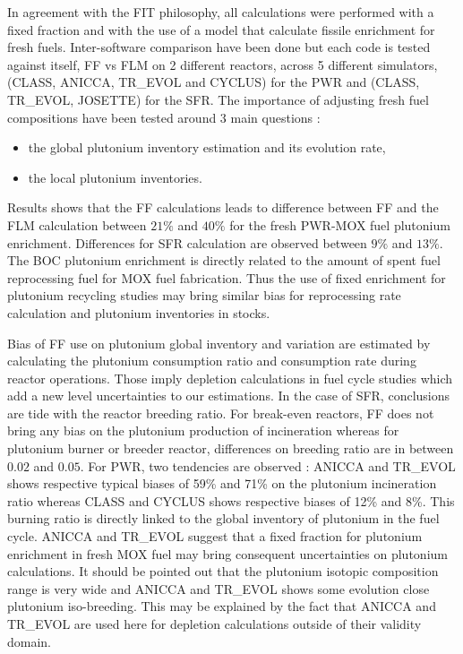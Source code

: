 In agreement with the FIT philosophy, all calculations were performed with a
fixed fraction and with the use of a model that calculate fissile enrichment for
fresh fuels. Inter-software comparison have been done but each code is tested
against itself, \gls{FF} vs \gls{FLM} on 2 different reactors, across 5 different
simulators, (CLASS, ANICCA, TR\_EVOL and CYCLUS) for the \gls{PWR} and (CLASS,
TR\_EVOL, JOSETTE) for the \gls{SFR}. The importance of adjusting fresh fuel
compositions have been tested around 3 main questions : 
\begin{itemize}
    \item the global plutonium inventory estimation and its evolution rate,
    \item the local plutonium inventories.
\end{itemize}

Results shows that the \gls{FF} calculations leads to difference between
\gls{FF} and the \gls{FLM} calculation between $21\%$ and $40\%$ for the fresh
\gls{PWR}-\gls{MOX} fuel plutonium enrichment. Differences for \gls{SFR}
calculation are observed between $9\%$ and $13\%$.  The \gls{BOC} plutonium
enrichment is directly related to the amount of spent fuel reprocessing fuel for
MOX fuel fabrication. Thus the use of fixed enrichment for plutonium recycling
studies may bring similar bias for reprocessing rate calculation and plutonium
inventories in stocks. 

Bias of \gls{FF} use on plutonium global inventory and variation are estimated
by calculating the plutonium consumption ratio and consumption rate during
reactor operations. Those imply depletion calculations in fuel cycle studies
which add a new level uncertainties to our estimations. In the case of
\gls{SFR}, conclusions are tide with the reactor breeding ratio. For break-even
reactors, \gls{FF} does not bring any bias on the plutonium production of
incineration whereas for plutonium burner or breeder reactor, differences on
breeding ratio are in between $0.02$ and $0.05$. For PWR, two tendencies are
observed : ANICCA and TR\_EVOL shows respective typical biases of 59\% and 71\%
on the plutonium incineration ratio whereas CLASS and CYCLUS shows respective
biases of 12\% and 8\%. This burning ratio is directly linked to the global
inventory of plutonium in the fuel cycle. ANICCA and TR\_EVOL suggest that a
fixed fraction for plutonium enrichment in fresh MOX fuel may bring consequent
uncertainties on plutonium calculations. It should be pointed out that the
plutonium isotopic composition range is very wide and ANICCA and TR\_EVOL shows
some evolution close plutonium iso-breeding. This may be explained by the fact
that ANICCA and TR\_EVOL are used here for depletion calculations outside of
their validity domain.        

